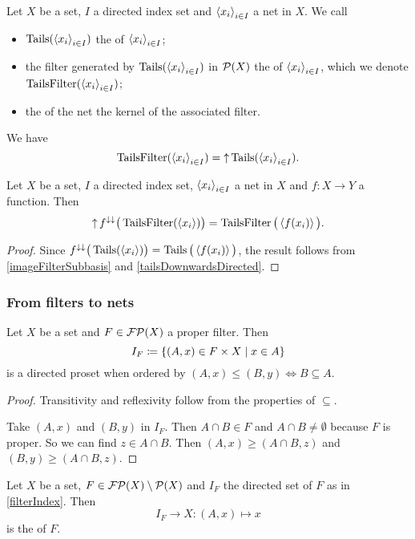 \begin{definition}
Let $X$ be a set, $I$ a directed index set and $\left\langle x_i \right\rangle_{i\in I}$ a net in $X$. We call
\begin{itemize}
\item $\operatorname{Tails}(\left\langle x_i \right\rangle_{i\in I})$ the  of $\left\langle x_i \right\rangle_{i\in I}$;
\item the filter generated by $\operatorname{Tails}(\left\langle x_i \right\rangle_{i\in I})$ in $\operatorname{\mathcal{P}}(X)$ the  of $\left\langle x_i \right\rangle_{i\in I}$, which we denote $\operatorname{TailsFilter}(\left\langle x_i \right\rangle_{i\in I})$;
\item the  of the net the kernel of the associated filter.
\end{itemize}
We have 
\[ \operatorname{TailsFilter}(\left\langle x_i \right\rangle_{i\in I}) = \operatorname{\uparrow} \operatorname{Tails}(\left\langle x_i \right\rangle_{i\in I}). \]
\end{definition}

\begin{lemma} \label{imageTailsFilter}
Let $X$ be a set, $I$ a directed index set, $\left\langle x_i \right\rangle_{i\in I}$ a net in $X$ and $f:X\to Y$ a function. Then
\[ \operatorname{\uparrow} f^{\downarrow\downarrow}\big(\operatorname{TailsFilter}(\left\langle x_i \right\rangle)\big) = \operatorname{TailsFilter}\big(\left\langle f(x_i) \right\rangle\big). \]
\end{lemma}
\begin{proof}
Since $f^{\downarrow\downarrow}\big(\operatorname{Tails}(\left\langle x_i \right\rangle)\big) = \operatorname{Tails}\big(\left\langle f(x_i) \right\rangle\big)$, the result follows from 
\ref{imageFilterSubbasis} and \ref{tailsDownwardsDirected}.
\end{proof}


\subsubsection{From filters to nets}
\begin{lemma} \label{filterIndex}
Let $X$ be a set and $F\in\operatorname{\mathcal{FP}}(X)$ a proper filter. Then
\[ I_F \defeq \setbuilder{(A,x)\in F\times X}{x\in A} \]
is a directed proset when ordered by $(A,x)\leq (B,y) \iff B\subseteq A$.
\end{lemma}
\begin{proof}
Transitivity and reflexivity follow from the properties of $\subseteq$.

Take $(A,x)$ and $(B,y)$ in $I_F$. Then $A\cap B\in F$ and $A\cap B \neq \emptyset$ because $F$ is proper. So we can find $z\in A\cap B$. Then $(A,x) \geq (A\cap B,z)$ and $(B,y) \geq (A\cap B, z)$.
\end{proof}

\begin{definition}
Let $X$ be a set, $F\in\operatorname{\mathcal{FP}}(X)\setminus\operatorname{\mathcal{P}}(X)$ and $I_F$ the directed set of $F$ as in \ref{filterIndex}. Then
\[ I_F \to X: (A,x) \mapsto x \]
is the  of $F$.
\end{definition}

